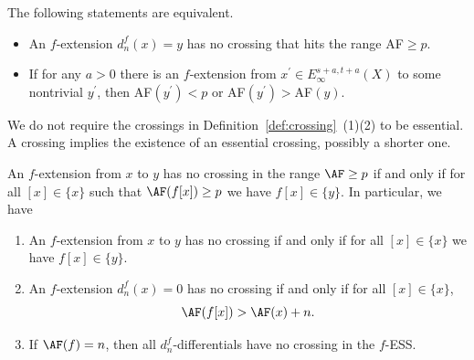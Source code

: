 \begin{remark}   

The following statements are equivalent.
\begin{itemize}
    \item An $f$-extension $d_n^{f}(x)=y$ has no crossing that hits the range AF$\ge p$. 
    \item If for any $a>0$ there is an $f$-extension from $x^\prime\in E_\infty^{s+a,t+a}(X)$ to some nontrivial $y^\prime$, then AF$(y^\prime)<p$ or AF$(y^\prime)>$AF$(y)$.
\end{itemize} 
\end{remark}
    
\begin{remark}   
We do not require the crossings in Definition~\ref{def:crossing}~(1)(2) to be essential. A crossing implies the existence of an essential crossing, possibly a shorter one.
\end{remark}


\begin{proposition} \label{prop:no-crossing-iff}
    An $f$-extension from $x$ to $y$ has no crossing in the range $\AF\ge p$ if and only if for all $[x]\in \{x\}$ such that $\AF(f[x])\ge p$ we have $f[x]\in \{y\}$. In particular, we have
    \begin{enumerate}
        \item An $f$-extension from $x$ to $y$ has no crossing if and only if for all $[x]\in \{x\}$ we have $f[x]\in \{y\}$.
        \item An $f$-extension $d_n^{f}(x)=0$ has no crossing if and only if for all $[x]\in \{x\}$,
        $$\AF(f[x]) >\AF(x)+n.$$
        \item If $\AF(f)=n$, then all $d^f_n$-differentials have no crossing in the $f$-ESS.
    \end{enumerate}
\end{proposition}


